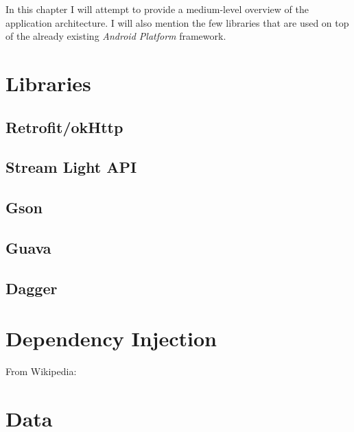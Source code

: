 \documentclass[english,a4paper,]{report}
\begin{document}
In this chapter I will attempt to provide a medium-level overview of the
application architecture. I will also mention the few libraries that are
used on top of the already existing \emph{Android Platform} framework.

\hypertarget{libraries}{%
\section{Libraries}\label{libraries}}

\hypertarget{retrofitokhttp}{%
\subsection{Retrofit/okHttp}\label{retrofitokhttp}}

\hypertarget{stream-light-api}{%
\subsection{Stream Light API}\label{stream-light-api}}

\hypertarget{gson}{%
\subsection{Gson}\label{gson}}

\hypertarget{guava}{%
\subsection{Guava}\label{guava}}

\hypertarget{dagger}{%
\subsection{Dagger}\label{dagger}}

\hypertarget{dependency-injection}{%
\section{Dependency Injection}\label{dependency-injection}}

From Wikipedia:

\begin{quote}
\end{quote}

\hypertarget{data}{%
\section{Data}\label{data}}
\end{document}
